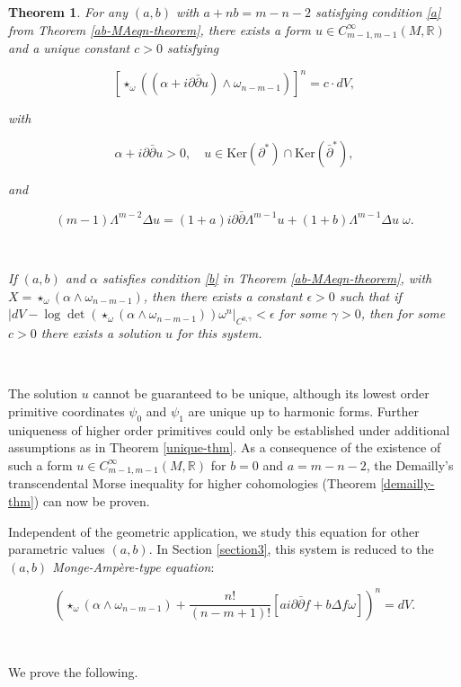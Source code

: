 \documentclass[11pt,letterpaper]{amsart}
\newcommand{\spartial}{\partial^*}
\newcommand{\pbp}{\partial \bar{\partial}}
\newcommand{\Ker}{\mbox{Ker}}
\newtheorem{theorem}{Theorem}[section]
\numberwithin{equation}{section}
\begin{document}
\begin{theorem}\label{exist-theorem}
  For any $(a,b)$ with $a+nb = m-n-2$ satisfying condition \ref{a} from Theorem \ref{ab-MAeqn-theorem}, there exists a form $u \in C^{\infty}_{m-1,m-1}(M, \mathbb R)$ and  a unique constant $c > 0$ satisfying

$$\left[\star_{\omega}\left((\alpha + i \pbp u)\wedge \omega_{n-m-1}\right)\right]^n = c \cdot dV,$$

\noindent with  

$$   \alpha + i \pbp u >0, \quad u \in \Ker (\spartial) \cap \Ker( \bar{\partial}^*),$$

\noindent and

$$ (m-1)\Lambda^{m-2} \Delta u = (1+a) i \pbp \Lambda^{m-1}  u +  (1+b) \Lambda^{m-1} \Delta u \;\omega.$$

\

If $(a,b)$ and $\alpha$ satisfies condition \ref{b} in Theorem \ref{ab-MAeqn-theorem}, with $X = \star_{\omega}(\alpha \wedge \omega_{n-m-1})$, then there exists a constant $\epsilon>0$ such that if $|dV - \log\det( \star_{\omega}(\alpha \wedge \omega_{n-m-1})) \omega^n|_{C^{0,\gamma}}< \epsilon$ for some $\gamma >0 $, then for some $c>0$ there exists a solution $u$ for this system.

\end{theorem}


\


The solution $u$ cannot be guaranteed to be unique, although its lowest order primitive coordinates $\psi_0$ and $\psi_1$ are unique up to harmonic forms. Further uniqueness of higher order primitives could only be established under additional assumptions as in Theorem \ref{unique-thm}. As a consequence of the existence of such a form $u \in C^{\infty}_{m-1,m-1}(M, \mathbb R)$ for $b=0$ and $a = m-n-2 $, the Demailly's transcendental Morse inequality for higher cohomologies (Theorem \ref{demailly-thm}) can now be proven.


Independent of the geometric application, we study this equation for other parametric values $(a,b)$. In Section \ref{section3}, this system is reduced to the {\em $(a,b)$ Monge-Amp\`ere-type equation}: 

$$    \left(\star_{\omega}(\alpha \wedge \omega_{n-m-1}) + \frac{n!}{(n-m+1)!} \left[ a i\pbp f + b \Delta f \omega\right] \right)^n = dV.$$

\

We prove the following.
\end{document}
